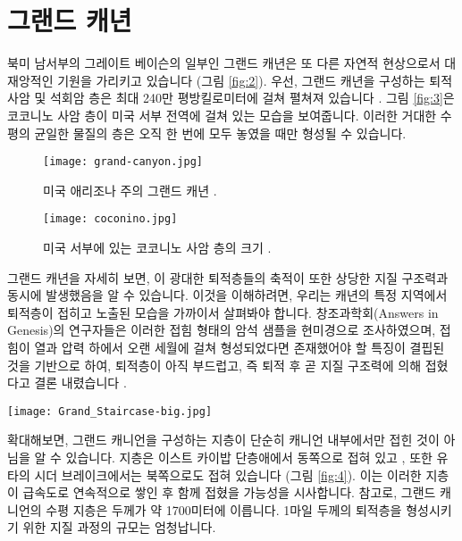 \documentclass[10pt,twocolumn,letterpaper]{article}
\begin{document}
\section{그랜드 캐년}

북미 남서부의 그레이트 베이슨의 일부인 그랜드 캐년은 또 다른 자연적 현상으로서 대재앙적인 기원을 가리키고 있습니다 (그림 \ref{fig:2}). 우선, 그랜드 캐년을 구성하는 퇴적 사암 및 석회암 층은 최대 240만 평방킬로미터에 걸쳐 펼쳐져 있습니다 \cite{21}. 그림 \ref{fig:3}은 코코니노 사암 층이 미국 서부 전역에 걸쳐 있는 모습을 보여줍니다. 이러한 거대한 수평의 균일한 물질의 층은 오직 한 번에 모두 놓였을 때만 형성될 수 있습니다.

\begin{figure}[b]
\begin{center}
   \texttt{[image: grand-canyon.jpg]}
\end{center}
   \caption{미국 애리조나 주의 그랜드 캐년 \cite{49}.}
\label{fig:2}
\label{fig:onecol}
\end{figure}

\begin{figure}[t]
\begin{center}
   \texttt{[image: coconino.jpg]}
\end{center}
   \caption{미국 서부에 있는 코코니노 사암 층의 크기 \cite{21}.}
\label{fig:3}
\label{fig:onecol}
\end{figure}

그랜드 캐년을 자세히 보면, 이 광대한 퇴적층들의 축적이 또한 상당한 지질 구조력과 동시에 발생했음을 알 수 있습니다. 이것을 이해하려면, 우리는 캐년의 특정 지역에서 퇴적층이 접히고 노출된 모습을 가까이서 살펴봐야 합니다. 창조과학회(Answers in Genesis)의 연구자들은 \cite{42} 이러한 접힘 형태의 암석 샘플을 현미경으로 조사하였으며, 접힘이 열과 압력 하에서 오랜 세월에 걸쳐 형성되었다면 존재했어야 할 특징이 결핍된 것을 기반으로 하여, 퇴적층이 아직 부드럽고, 즉 퇴적 후 곧 지질 구조력에 의해 접혔다고 결론 내렸습니다 \cite{43}.

\begin{figure*}
\begin{center}
\texttt{[image: Grand\_Staircase-big.jpg]}
\end{center}
   \caption{그랜드 캐년(그림의 오른쪽)을 구성하는 퇴적층은 유타주의 세다 브레이크(그림의 왼쪽)까지 북쪽으로 직접 확장되며, 그곳에서 모두 위로 휘어집니다 \cite{50}.}
\label{fig:4}
\end{figure*}

확대해보면, 그랜드 캐니언을 구성하는 지층이 단순히 캐니언 내부에서만 접힌 것이 아님을 알 수 있습니다. 지층은 이스트 카이밥 단층애에서 동쪽으로 접혀 있고 \cite{46}, 또한 유타의 시더 브레이크에서는 북쪽으로도 접혀 있습니다 (그림 \ref{fig:4}). 이는 이러한 지층이 급속도로 연속적으로 쌓인 후 함께 접혔을 가능성을 시사합니다. 참고로, 그랜드 캐니언의 수평 지층은 두께가 약 1700미터에 이릅니다. 1마일 두께의 퇴적층을 형성시키기 위한 지질 과정의 규모는 엄청납니다.
\end{document}
